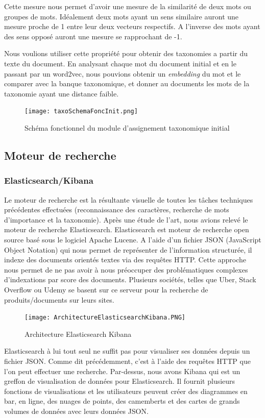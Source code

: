 Cette mesure nous permet d'avoir une mesure de la similarité de deux mots ou groupes de mots.
Idéalement deux mots ayant un sens similaire auront une mesure proche de 1 entre leur deux vecteurs respectifs.
A l'inverse des mots ayant des sens opposé auront une mesure se rapprochant de -1. 

Nous voulions utiliser cette propriété pour obtenir des taxonomies a partir du texte du document.
En analysant chaque mot du document initial et en le passant par un word2vec, nous pouvions obtenir un \textit{embedding} du mot et le comparer avec la banque taxonomique, et donner au documents les mots de la taxonomie ayant une distance faible. 

\begin{figure}[h!]
  \centering
  \texttt{[image: taxoSchemaFoncInit.png]}
	\caption[]{Schéma fonctionnel du module d'assignement taxonomique initial}
  \label{taxoInit}
\end{figure}



\subsection{Moteur de recherche} %
\subsubsection{Elasticsearch/Kibana}
Le moteur de recherche est la résultante visuelle de toutes les tâches techniques précédentes effectuées (reconnaissance des caractères, recherche de mots d’importance et la taxonomie).
Après une étude de l’art, nous avions relevé le moteur de recherche Elasticsearch. 
Elasticsearch est moteur de recherche open source basé sous le logiciel Apache Lucene.
A l’aide d’un fichier JSON (JavaScript Object Notation) qui nous permet de représenter de l’information structurée, il indexe des documents orientés textes via des requêtes HTTP.
Cette approche nous permet de ne pas avoir à nous préoccuper des problématiques complexes d’indexations par score des documents.
Plusieurs sociétés, telles que Uber, Stack Overflow ou Udemy se basent sur ce serveur pour la recherche de produits/documents sur leurs sites. 

\begin{figure}[h!]
  \centering
  \texttt{[image: ArchitectureElasticsearchKibana.PNG]}
	\caption[]{Architecture Elasticsearch Kibana}
  \label{}
\end{figure}


Elasticsearch à lui tout seul ne suffit pas pour visualiser ses données depuis un fichier JSON.
Comme dit précédemment, c’est à l’aide des requêtes HTTP que l’on peut effectuer une recherche.
Par-dessus, nous avons Kibana qui est un greffon de visualisation de données pour Elasticsearch.
Il fournit plusieurs fonctions de visualisations et les utilisateurs peuvent créer des diagrammes en bar, en ligne, des nuages de points, des camemberts et des cartes de grands volumes de données avec leurs données JSON.

